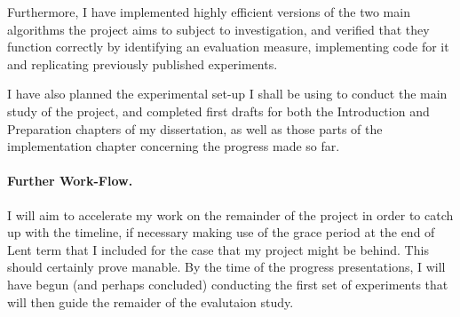 \documentclass[10pt, twoside, a4paper]{article}
\begin{document}
Furthermore, I have implemented highly efficient versions of the two main algorithms the project aims to subject to investigation, and verified that they function correctly by identifying an evaluation measure, implementing code for it and replicating previously published experiments. 

I have also planned the experimental set-up I shall be using to conduct the main study of the project, and completed first drafts for both the Introduction and Preparation chapters of my dissertation, as well as those parts of the implementation chapter concerning the progress made so far.

\paragraph{Further Work-Flow.}
I will aim to accelerate my work on the remainder of the project in order to catch up with the timeline, if necessary making use of the grace period at the end of Lent term that I included for the case that my project might be behind. This should certainly prove manable. By the time of the progress presentations, I will have begun (and perhaps concluded) conducting the first set of experiments that will then guide the remaider of the evalutaion study.
\end{document}
